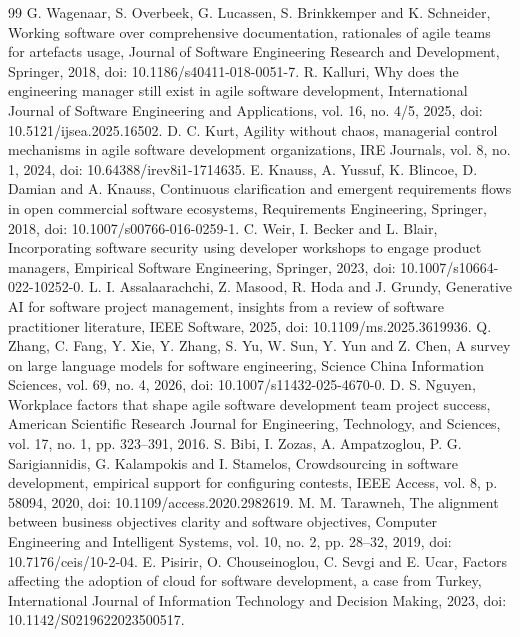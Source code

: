 \documentclass[conference]{IEEEtran}
\begin{document}
\begin{thebibliography}{99}
 G. Wagenaar, S. Overbeek, G. Lucassen, S. Brinkkemper and K. Schneider, Working software over comprehensive documentation, rationales of agile teams for artefacts usage, Journal of Software Engineering Research and Development, Springer, 2018, doi: 10.1186/s40411-018-0051-7.
 R. Kalluri, Why does the engineering manager still exist in agile software development, International Journal of Software Engineering and Applications, vol. 16, no. 4/5, 2025, doi: 10.5121/ijsea.2025.16502.
 D. C. Kurt, Agility without chaos, managerial control mechanisms in agile software development organizations, IRE Journals, vol. 8, no. 1, 2024, doi: 10.64388/irev8i1-1714635.
 E. Knauss, A. Yussuf, K. Blincoe, D. Damian and A. Knauss, Continuous clarification and emergent requirements flows in open commercial software ecosystems, Requirements Engineering, Springer, 2018, doi: 10.1007/s00766-016-0259-1.
 C. Weir, I. Becker and L. Blair, Incorporating software security using developer workshops to engage product managers, Empirical Software Engineering, Springer, 2023, doi: 10.1007/s10664-022-10252-0.
 L. I. Assalaarachchi, Z. Masood, R. Hoda and J. Grundy, Generative AI for software project management, insights from a review of software practitioner literature, IEEE Software, 2025, doi: 10.1109/ms.2025.3619936.
 Q. Zhang, C. Fang, Y. Xie, Y. Zhang, S. Yu, W. Sun, Y. Yun and Z. Chen, A survey on large language models for software engineering, Science China Information Sciences, vol. 69, no. 4, 2026, doi: 10.1007/s11432-025-4670-0.
 D. S. Nguyen, Workplace factors that shape agile software development team project success, American Scientific Research Journal for Engineering, Technology, and Sciences, vol. 17, no. 1, pp. 323--391, 2016.
 S. Bibi, I. Zozas, A. Ampatzoglou, P. G. Sarigiannidis, G. Kalampokis and I. Stamelos, Crowdsourcing in software development, empirical support for configuring contests, IEEE Access, vol. 8, p. 58094, 2020, doi: 10.1109/access.2020.2982619.
 M. M. Tarawneh, The alignment between business objectives clarity and software objectives, Computer Engineering and Intelligent Systems, vol. 10, no. 2, pp. 28--32, 2019, doi: 10.7176/ceis/10-2-04.
 E. Pisirir, O. Chouseinoglou, C. Sevgi and E. Ucar, Factors affecting the adoption of cloud for software development, a case from Turkey, International Journal of Information Technology and Decision Making, 2023, doi: 10.1142/S0219622023500517.

\end{thebibliography}
\end{document}
